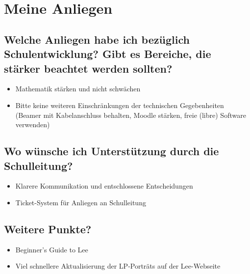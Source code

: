 \section{Meine Anliegen}
\subsection{Welche Anliegen habe ich bezüglich Schulentwicklung? Gibt es Bereiche, die
	stärker beachtet werden sollten?}
\begin{itemize}
	\item Mathematik stärken und nicht schwächen
	\item Bitte keine weiteren Einschränkungen der technischen Gegebenheiten (Beamer mit Kabelanschluss behalten, Moodle stärken, freie (libre) Software verwenden)
\end{itemize}

\subsection{Wo wünsche ich Unterstützung durch die Schulleitung?}
\begin{itemize}
	\item Klarere Kommunikation und entschlossene Entscheidungen
	\item Ticket-System für Anliegen an Schulleitung
\end{itemize}

\subsection{Weitere Punkte?}
\begin{itemize}
	\item Beginner's Guide to Lee
	\item Viel schnellere Aktualisierung der LP-Porträts auf der Lee-Webseite
\end{itemize}
